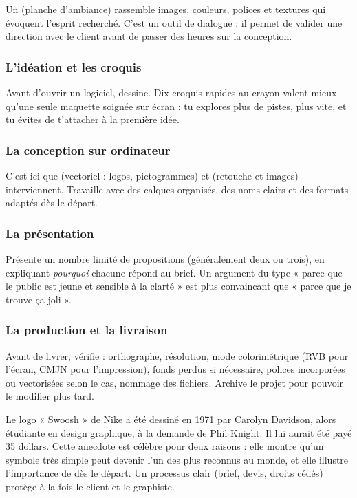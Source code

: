 Un  (planche d'ambiance) rassemble images, couleurs, polices et textures qui évoquent l'esprit recherché. C'est un outil de dialogue : il permet de valider une direction avec le client avant de passer des heures sur la conception.

\subsubsection{L'idéation et les croquis}

Avant d'ouvrir un logiciel, dessine. Dix croquis rapides au crayon valent mieux qu'une seule maquette soignée sur écran : tu explores plus de pistes, plus vite, et tu évites de t'attacher à la première idée.

\subsubsection{La conception sur ordinateur}

C'est ici que  (vectoriel : logos, pictogrammes) et  (retouche et images) interviennent. Travaille avec des calques organisés, des noms clairs et des formats adaptés dès le départ.

\subsubsection{La présentation}

Présente un nombre limité de propositions (généralement deux ou trois), en expliquant \emph{pourquoi} chacune répond au brief. Un argument du type « parce que le public est jeune et sensible à la clarté » est plus convaincant que « parce que je trouve ça joli ».

\subsubsection{La production et la livraison}

Avant de livrer, vérifie : orthographe, résolution, mode colorimétrique (RVB pour l'écran, CMJN pour l'impression), fonds perdus si nécessaire, polices incorporées ou vectorisées selon le cas, nommage des fichiers. Archive le projet pour pouvoir le modifier plus tard.

\begin{defbox}
Le logo « Swoosh » de Nike a été dessiné en 1971 par Carolyn Davidson, alors étudiante en design graphique, à la demande de Phil Knight. Il lui aurait été payé 35 dollars. Cette anecdote est célèbre pour deux raisons : elle montre qu'un symbole très simple peut devenir l'un des plus reconnus au monde, et elle illustre l'importance de  dès le départ. Un processus clair (brief, devis, droits cédés) protège à la fois le client et le graphiste.
\end{defbox}

